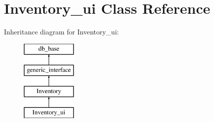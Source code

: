 \hypertarget{class_inventory__ui}{}\section{Inventory\+\_\+ui Class Reference}
\label{class_inventory__ui}
Inheritance diagram for Inventory\+\_\+ui\+:\begin{figure}[H]
\begin{center}
\leavevmode
\includegraphics[height=4.000000cm]{da/d83/class_inventory__ui}
\end{center}
\end{figure}
